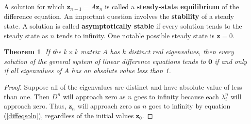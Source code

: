 \documentclass[12pt]{article}
\renewcommand{\vec}[1]{\mathbf{#1}}
\newtheorem{theorem}{Theorem}
\theoremstyle{definition}
\begin{document}
A solution for which $\vec{z}_{n+1}=A\vec{z}_n$ is called a \textbf{steady-state equilibrium} of the difference equation. An important question involves the \textbf{stability} of a steady state. A solution is called \textbf{asymptotically stable} if every solution tends to the steady state as $n$ tends to infinity. One notable possible steady state is $\vec{z}=0$. 

\begin{theorem}
	If the $k \times k$ matrix $A$ has $k$ distinct real eigenvalues, then every solution of the general system of linear difference equations tends to $\vec{0}$ if and only if all eigenvalues of $A$ has an absolute value less than 1. 
\end{theorem}
\begin{proof}
	Suppose all of the eigenvalues are distinct and have absolute value of less than one. Then $D^n$ will approach zero as $n$ goes to infinity because each $\lambda_i^n$ will approach zero. Thus, $\vec{z}_n$ will approach zero as $n$ goes to infinity by equation (\ref{diffeqsoln}), regardless of the initial values $\vec{z}_0$. 
\end{proof}
\end{document}
